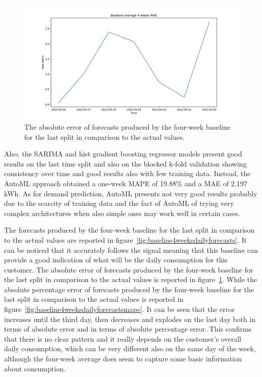 \begin{figure}[H]
\centering
\includegraphics[width=1\textwidth]{images/baseline/baseline_average_4_weeks_daily_aggregated_mae}
\caption{The absolute error of forecasts produced by the four-week baseline for the last split in comparison to the actual values.}
\label{fig:baseline4weeksdailyforecastsmae}
\end{figure}

Also, the SARIMA and hist gradient boosting regressor models present good results on the last time split and also on the blocked k-fold validation showing consistency over time and good results also with few training data.
Instead, the AutoML approach obtained a one-week MAPE of 19.88\% and a MAE of 2.197 kWh.
As for demand prediction, AutoML presents not very good results probably due to the scarcity of training data and the fact of AutoML of trying very complex architectures when also simple ones may work well in certain cases.

The forecasts produced by the four-week baseline for the last split in comparison to the actual values are reported in figure~\ref{fig:baseline4weeksdailyforecasts}.
It can be noticed that it accurately follows the signal meaning that this baseline can provide a good indication of what will be the daily consumption for this customer.
The absolute error of forecasts produced by the four-week baseline for the last split in comparison to the actual values is reported in figure~\ref{fig:baseline4weeksdailyforecastsmae}.
While the absolute percentage error of forecasts produced by the four-week baseline for the last split in comparison to the actual values is reported in figure~\ref{fig:baseline4weeksdailyforecastsmape}.
It can be seen that the error increases until the third day, then decreases and explodes on the last day both in terms of absolute error and in terms of absolute percentage error.
This confirms that there is no clear pattern and it really depends on the customer's overall daily consumption, which can be very different also on the same day of the week, although the four-week average does seem to capture some basic information about consumption.

